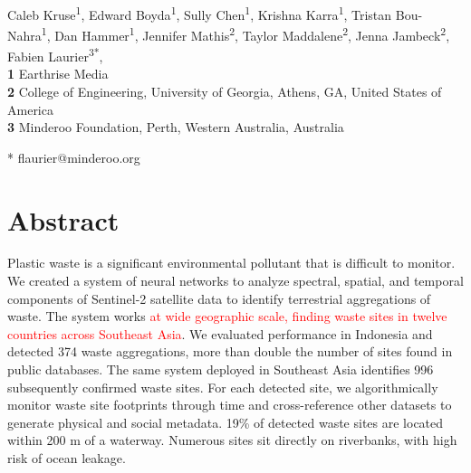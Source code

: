 \documentclass[10pt,letterpaper]{article}
\begin{document}
\vspace*{0.2in}

\begin{flushleft}
{\Large
\textbf{} %
}
\newline
\\
Caleb Kruse\textsuperscript{1},
Edward Boyda\textsuperscript{1},
Sully Chen\textsuperscript{1},
Krishna Karra\textsuperscript{1},
Tristan Bou-Nahra\textsuperscript{1},
Dan Hammer\textsuperscript{1},
Jennifer Mathis\textsuperscript{2},
Taylor Maddalene\textsuperscript{2},
Jenna Jambeck\textsuperscript{2},
Fabien Laurier\textsuperscript{3*},
\\
\bigskip
\textbf{1} Earthrise Media\color{red}{, Berkeley, CA, United States of America}
\\
\textbf{2} College of Engineering, University of Georgia, Athens, GA, United States of America
\\
\textbf{3} Minderoo Foundation, Perth, Western Australia, Australia
\\
\bigskip

% 
%

* flaurier@minderoo.org

\end{flushleft}
\section*{Abstract}
Plastic waste is a significant environmental pollutant that is difficult to monitor. We created a system of neural networks to analyze spectral, spatial, and temporal components of Sentinel-2 satellite data to identify terrestrial aggregations of waste. The system works \textcolor{red}{at wide geographic scale, finding waste sites in twelve countries across Southeast Asia}. We evaluated performance in Indonesia and detected 374 waste aggregations, more than double the number of sites found in public databases. The same system deployed in Southeast Asia identifies 996 subsequently confirmed waste sites. For each detected site, we algorithmically monitor waste site footprints through time and cross-reference other datasets to generate physical and social metadata. 19\% of detected waste sites are located within 200 m of a waterway. Numerous sites sit directly on riverbanks, with high risk of ocean leakage.
\end{document}
